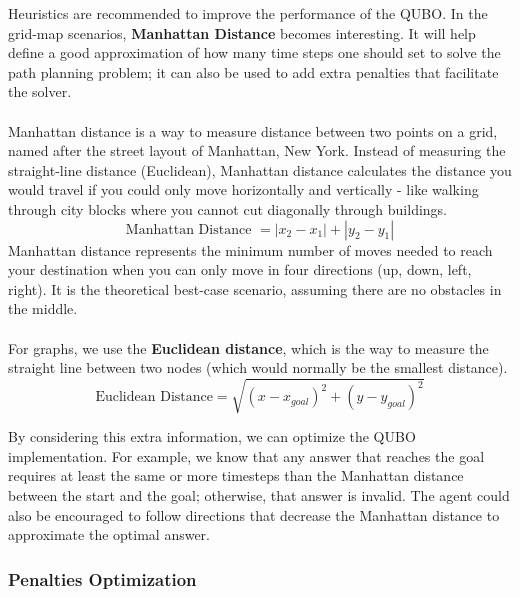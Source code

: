 \documentclass[11pt]{article}
\begin{document}
Heuristics are recommended to improve the performance of the QUBO. In the grid-map scenarios, \textbf{Manhattan Distance} becomes interesting. It will help define a good approximation of how many time steps one should set to solve the path planning problem; it can also be used to add extra penalties that facilitate the solver.\\
\\
Manhattan distance is a way to measure distance between two points on a grid, named after the street layout of Manhattan, New York. Instead of measuring the straight-line distance (Euclidean), Manhattan distance calculates the distance you would travel if you could only move horizontally and vertically - like walking through city blocks where you cannot cut diagonally through buildings.
\[
\text{Manhattan Distance } = |x_2-x_1|+|y_2-y_1|
\]
Manhattan distance represents the minimum number of moves needed to reach your destination when you can only move in four directions (up, down, left, right). It is the theoretical best-case scenario, assuming there are no obstacles in the middle.\\
\\
For graphs, we use the \textbf{Euclidean distance}, which is the way to measure the straight line between two nodes (which would normally be the smallest distance).
\[\text{Euclidean Distance}=\sqrt{(x-x_{goal})^2 +(y-y_{goal})^2}\]

By considering this extra information, we can optimize the QUBO implementation. For example, we know that any answer that reaches the goal requires at least the same or more timesteps than the Manhattan distance between the start and the goal; otherwise, that answer is invalid. The agent could also be encouraged to follow directions that decrease the Manhattan distance to approximate the optimal answer. 

\subsubsection{Penalties Optimization}
\end{document}
